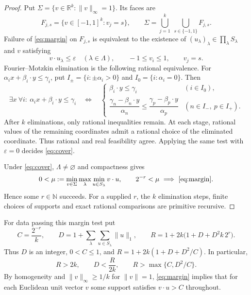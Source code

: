 \documentclass[12pt]{article}
\numberwithin{equation}{section}
\theoremstyle{definition}
\theoremstyle{remark}
\newcommand{\R}{\mathbb R}
\newcommand{\N}{\mathbb N}
\newcommand{\norm}[1]{\lVert #1\rVert}
\begin{document}
\begin{proof}
Put $\Sigma=\{v\in\R^k:\norm v_\infty=1\}$. Its faces are
\[
 F_{j,s}=\{v\in[-1,1]^k:v_j=s\},\qquad
 \Sigma=\bigcup_{j=1}^{k}\ \bigcup_{s\in\{-1,1\}}F_{j,s}.
\]
Failure of \eqref{eq:margin} on $F_{j,s}$ is equivalent to the
existence of $(u_\lambda)_\lambda\in\prod_\lambda S_\lambda$ and $v$ satisfying
\begin{equation}
\label{eq:linear}
 v\cdot u_\lambda\le\varepsilon\quad(\lambda\in\Lambda),
 \qquad -1\le v_i\le1,\qquad v_j=s.
\end{equation}
Fourier--Motzkin elimination is the following rational equivalence.
For $\alpha_i x+\beta_i\cdot y\le\gamma_i$, put
$I_\pm=\{i:\pm\alpha_i>0\}$ and $I_0=\{i:\alpha_i=0\}$. Then
\[
 \exists x\ \forall i:\ \alpha_i x+\beta_i\cdot y\le\gamma_i
 \quad\Longleftrightarrow\quad
 \begin{cases}
  \beta_i\cdot y\le\gamma_i &(i\in I_0),\\[4pt]
  \dfrac{\gamma_n-\beta_n\cdot y}{\alpha_n}
  \le\dfrac{\gamma_p-\beta_p\cdot y}{\alpha_p}
       &(n\in I_-,\ p\in I_+).
 \end{cases}
\]
After $k$ eliminations, only rational inequalities remain. At each
stage, rational values of the remaining coordinates admit a rational
choice of the eliminated coordinate. Thus rational and real
feasibility agree. Applying the same test with $\varepsilon=0$
decides \eqref{eq:cover}.

Under \eqref{eq:cover}, $\Lambda\ne\varnothing$ and compactness gives
\[
 0<\mu:=\min_{v\in\Sigma}\max_\lambda
                \min_{u\in S_\lambda}v\cdot u,
 \qquad 2^{-r}<\mu\ \Longrightarrow\ \eqref{eq:margin}.
\]
Hence some $r\in\N$ succeeds. For a supplied $r$, the $k$ elimination
steps, finite choices of supports and exact rational comparisons
are primitive recursive.
\end{proof}

For data passing this margin test put
\begin{equation}
\label{eq:constants}
 C=\frac{2^{-r}}{k},\qquad
 D=1+\sum_\lambda\sum_{u\in S_\lambda}\norm u_1,\qquad
 R=1+2k\bigl(1+D+D^2k\,2^r\bigr).
\end{equation}
Thus $D$ is an integer, $0<C\le1$, and
$R=1+2k(1+D+D^2/C)$. In particular,
\begin{equation}
\label{eq:large-radius}
 R>2k,\qquad D<\frac{R}{2k},\qquad R>\max\{C,D^2/C\}.
\end{equation}
By homogeneity and $\norm v_\infty\ge1/k$ for $\norm v=1$,
\eqref{eq:margin} implies that for each Euclidean unit vector $v$
some support satisfies $v\cdot u>C$ throughout.
\end{document}
